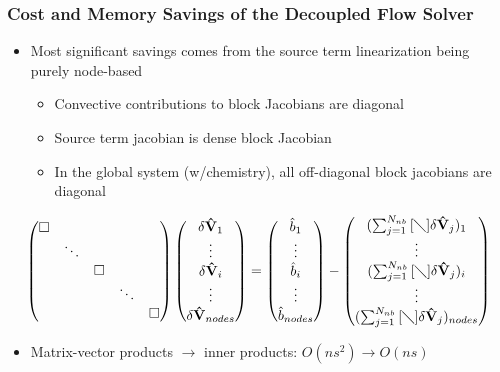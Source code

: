 \documentclass{beamer}
\begin{document}
\begin{frame}
  \frametitle{Cost and Memory Savings of the Decoupled Flow Solver}
\begin{itemize}
  \item Most significant savings comes from the source term linearization being purely node-based
    \begin{itemize}
      \item Convective contributions to block Jacobians are diagonal
      \item Source term jacobian is dense block Jacobian
      \item In the global system (w/chemistry), all off-diagonal block jacobians
        are diagonal
    \end{itemize}
  \end{itemize}
  \[
    \begin{pmatrix} 
      \Box & & & & \\ 
      & \ddots & & & \\ 
      & & \Box \\ 
      & & & \ddots & \\ 
      & & & & \Box
    \end{pmatrix} \begin{pmatrix} \delta \mathbf{\hat{V}}_1 \\ \vdots \\ \delta
      \mathbf{\hat{V}}_i \\ \vdots \\ \delta \mathbf{\hat{V}}_{nodes}
    \end{pmatrix} = \begin{pmatrix} \hat{b}_1 \\ \vdots \\ \hat{b}_i \\ \vdots \\
      \hat{b}_{nodes} \end{pmatrix} - \begin{pmatrix}
      (\sum_{j=1}^{N_{nb}}{[\diagdown] \delta\mathbf{\hat{V}}_{j}})_1 \\ \vdots \\
      (\sum_{j=1}^{N_{nb}}{[\diagdown] \delta\mathbf{\hat{V}}_{j}})_i \\ \vdots \\
      (\sum_{j=1}^{N_{nb}}{[\diagdown] \delta\mathbf{\hat{V}}_{j}})_{nodes}
    \end{pmatrix} 
  \]
  \begin{itemize}
    \item Matrix-vector products $\to$ inner products: $O(ns^2) \to O(ns)$
  \end{itemize}
\end{frame}
\end{document}
